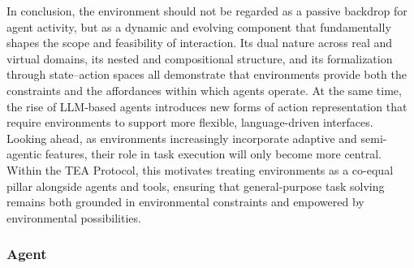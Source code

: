 \documentclass[11pt]{article}
\begin{document}
In conclusion, the environment should not be regarded as a passive backdrop for agent activity, but as a dynamic and evolving component that fundamentally shapes the scope and feasibility of interaction. Its dual nature across real and virtual domains, its nested and compositional structure, and its formalization through state–action spaces all demonstrate that environments provide both the constraints and the affordances within which agents operate. At the same time, the rise of LLM-based agents introduces new forms of action representation that require environments to support more flexible, language-driven interfaces. Looking ahead, as environments increasingly incorporate adaptive and semi-agentic features, their role in task execution will only become more central. Within the TEA Protocol, this motivates treating environments as a co-equal pillar alongside agents and tools, ensuring that general-purpose task solving remains both grounded in environmental constraints and empowered by environmental possibilities.


\subsubsection{Agent}

\end{document}
